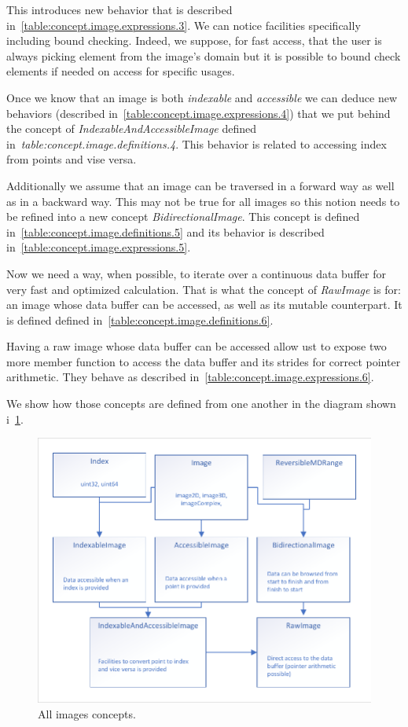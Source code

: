 This introduces new behavior that is described in~\cref{table:concept.image.expressions.3}. We can notice facilities
specifically including bound checking. Indeed, we suppose, for fast access, that the user is always picking element from
the image's domain but it is possible to bound check elements if needed on access for specific usages.

Once we know that an image is both \emph{indexable} and \emph{accessible} we can deduce new behaviors (described
in~\cref{table:concept.image.expressions.4}) that we put behind the concept of \emph{IndexableAndAccessibleImage}
defined in~\emph{table:concept.image.definitions.4}. This behavior is related to accessing index from points and vise
versa.

Additionally we assume that an image can be traversed in a forward way as well as in a backward way. This may not be
true for all images so this notion needs to be refined into a new concept \emph{BidirectionalImage}. This concept is
defined in~\cref{table:concept.image.definitions.5} and its behavior is described
in~\cref{table:concept.image.expressions.5}.

Now we need a way, when possible, to iterate over a continuous data buffer for very fast and optimized calculation. That
is what the concept of \emph{RawImage} is for: an image whose data buffer can be accessed, as well as its mutable
counterpart. It is defined defined in~\cref{table:concept.image.definitions.6}.

Having a raw image whose data buffer can be accessed allow ust to expose two more member function to access the data
buffer and its strides for correct pointer arithmetic. They behave as described
in~\cref{table:concept.image.expressions.6}.

We show how those concepts are defined from one another in the diagram shown i~\cref{fig:concept.images}.

\begin{figure}[tbh]
  \centering
  \includegraphics[width=.8\linewidth]{figs/concepts/images_all.pdf}
  \caption{All images concepts.}
  \label{fig:concept.images}
\end{figure}


